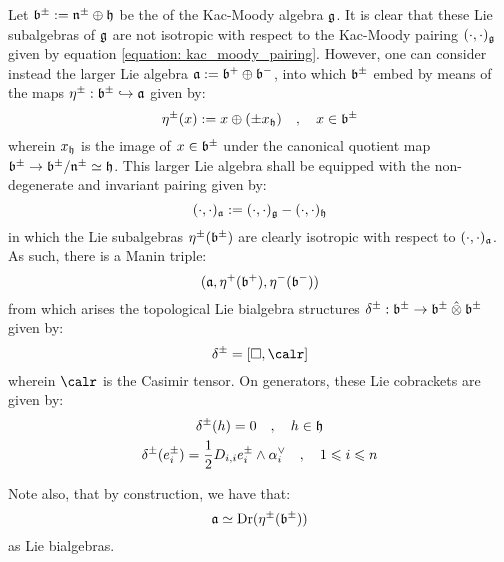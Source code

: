 Let $\mathfrak{b}^{\pm} := \mathfrak{n}^{\pm} \oplus \mathfrak{h}$ be the  of the Kac-Moody algebra $\mathfrak{g}$. It is clear that these Lie subalgebras of $\mathfrak{g}$ are not isotropic with respect to the Kac-Moody pairing $(\cdot, \cdot)_{\mathfrak{g}}$ given by equation \eqref{equation: kac_moody_pairing}. However, one can consider instead the larger Lie algebra $\mathfrak{a} := \mathfrak{b}^+ \oplus \mathfrak{b}^-$, into which $\mathfrak{b}^{\pm}$ embed by means of the maps $\eta^{\pm}: \mathfrak{b}^{\pm} \hookrightarrow \mathfrak{a}$ given by:
    \begin{equation} \label{equation: borel_lie_sub_bialgebra_embeddings}
        \eta^{\pm}(x) := x \oplus ( \pm x_{\mathfrak{h}} ) \quad, \quad x \in \mathfrak{b}^{\pm}
    \end{equation}
wherein $x_{\mathfrak{h}}$ is the image of $x \in \mathfrak{b}^{\pm}$ under the canonical quotient map $\mathfrak{b}^{\pm} \to \mathfrak{b}^{\pm}/\mathfrak{n}^{\pm} \simeq \mathfrak{h}$. This larger Lie algebra shall be equipped with the non-degenerate and invariant pairing given by:
    $$(\cdot, \cdot)_{\mathfrak{a}} := (\cdot, \cdot)_{\mathfrak{g}} - (\cdot, \cdot)_{\mathfrak{h}}$$
in which the Lie subalgebras $\eta^{\pm}(\mathfrak{b}^{\pm})$ are clearly isotropic with respect to $(\cdot, \cdot)_{\mathfrak{a}}$. As such, there is a Manin triple:
    $$(\mathfrak{a}, \eta^+(\mathfrak{b}^+), \eta^-(\mathfrak{b}^-))$$
from which arises the topological Lie bialgebra structures $\delta^{\pm}: \b^{\pm} \to \b^{\pm} \hattensor \b^{\pm}$ given by:
    $$\delta^{\pm} = [\Box, \calr]$$
wherein $\calr$ is the Casimir tensor. On generators, these Lie cobrackets are given by:
    \begin{equation} \label{equation: standard_kac_moody_lie_bialgebra_structure}
        \begin{gathered}
            \delta^{\pm}(h) = 0 \quad, \quad h \in \mathfrak{h}
            \\
            \delta^{\pm}(e_i^{\pm}) = \frac12 D_{i, i} e_i^{\pm} \wedge \alpha_i^{\vee} \quad, \quad 1 \leqslant i \leqslant n
        \end{gathered}
    \end{equation}
\begin{remark}
    Note also, that by construction, we have that:
        $$\mathfrak{a} \simeq \operatorname{Dr}( \eta^{\pm}( \mathfrak{b}^{\pm} ) )$$
    as Lie bialgebras.
\end{remark}
    

